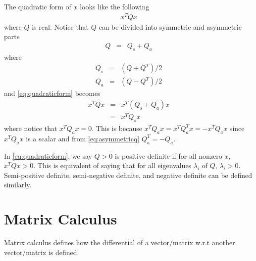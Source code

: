 The quadratic form of $x$ looks like the following
\begin{eqnarray}
	x^TQx \label{eq:quadraticform}
\end{eqnarray}
where $Q$ is real. Notice that $Q$ can be divided into symmetric and asymmetric parts
\begin{eqnarray}
	Q &=& Q_s + Q_a \nonumber
\end{eqnarray}
where
\begin{eqnarray}
	Q_s &=& (Q + Q^T) / 2 \nonumber \\
	Q_a &=& (Q - Q^T) / 2 \label{eq:asymmetricq}
\end{eqnarray}
and \eqref{eq:quadraticform} becomes
\begin{eqnarray}
	x^TQx &=& x^T(Q_s + Q_a)x \nonumber \\
	&=& x^TQ_sx \nonumber
\end{eqnarray}
where notice that $x^TQ_ax = 0$. This is because $x^TQ_ax=x^TQ_a^Tx=-x^TQ_ax$ since $x^TQ_ax$ is a scalar and from \eqref{eq:asymmetricq} $Q_a^T=-Q_a$.

In \eqref{eq:quadraticform}, we say $Q>0$ is positive definite if for all nonzero $x$, $x^TQx>0$. This is equivalent of saying that for all eigenvalues $\lambda_i$ of $Q$, $\lambda_i>0$. Semi-positive definite, semi-negative definite, and negative definite can be defined similarly.

\section{Matrix Calculus}

Matrix calculus defines how the differential of a vector/matrix w.r.t another vector/matrix is defined.

